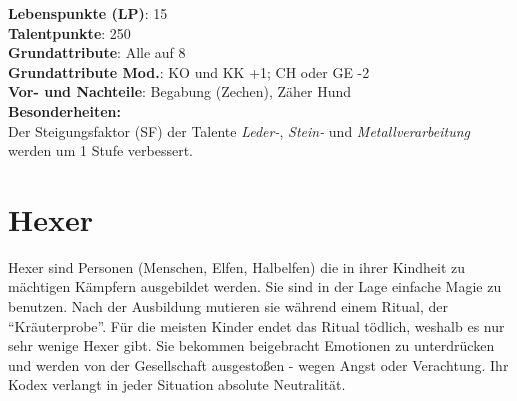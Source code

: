 \textbf{Lebenspunkte (LP)}: 15 \\
\textbf{Talentpunkte}: 250 \\
\textbf{Grundattribute}: Alle auf 8 \\
\textbf{Grundattribute Mod.}: KO und KK +1; CH oder GE -2 \\
\textbf{Vor- und Nachteile}: Begabung (Zechen), Zäher Hund \\

\textbf{Besonderheiten:} \\
Der Steigungsfaktor (SF) der Talente \textit{Leder-}, \textit{Stein-} und \textit{Metallverarbeitung} werden um 1 Stufe verbessert.

\section{Hexer}
Hexer sind Personen (Menschen, Elfen, Halbelfen) die in ihrer Kindheit zu mächtigen Kämpfern ausgebildet werden. Sie sind in der Lage einfache Magie zu benutzen. Nach der Ausbildung mutieren sie während einem Ritual, der "`Kräuterprobe"'. Für die meisten Kinder endet das Ritual tödlich, weshalb es nur sehr wenige Hexer gibt. Sie bekommen beigebracht Emotionen zu unterdrücken und werden von der Gesellschaft ausgestoßen - wegen Angst oder Verachtung. Ihr Kodex verlangt in jeder Situation absolute Neutralität.
